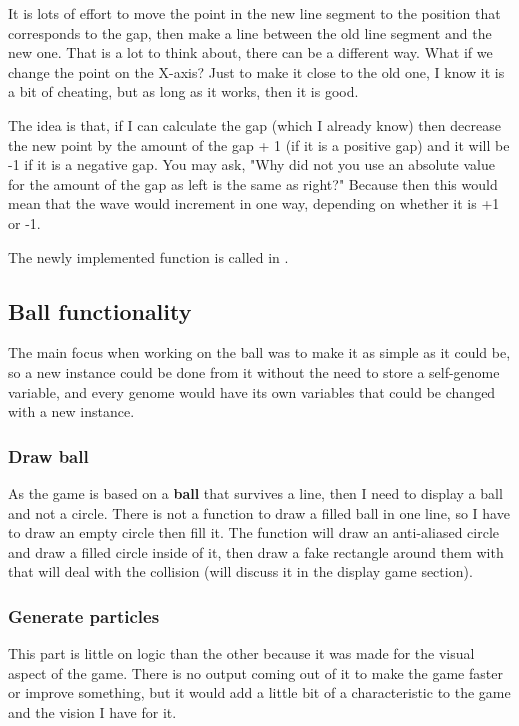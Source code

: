 It is lots of effort to move the point in the new line segment to the position that corresponds to the gap, then make a line between the old line segment and the new one. That is a lot to think about, there can be a different way. What if we change the point on the X-axis? Just to make it close to the old one, I know it is a bit of cheating, but as long as it works, then it is good.

The idea is that, if I can calculate the gap (which I already know) then decrease the new point by the amount of the gap + 1 (if it is a positive gap) and it will be -1 if it is a negative gap. You may ask, "Why did not you use an absolute value for the amount of the gap as left is the same as right?" Because then this would mean that the wave would increment in one way, depending on whether it is +1 or -1.

The newly implemented function is called  in .


\subsection{Ball functionality}\label{ball-functionality}
The main focus when working on the ball was to make it as simple as it could be, so a new instance could be done from it without the need to store a self-genome variable, and every genome would have its own variables that could be changed with a new instance.

\subsubsection{Draw ball}\label{draw-ball}
As the game is based on a \textbf{ball} that survives a line, then I need to display a ball and not a circle. There is not a function to draw a filled ball in one line, so I have to draw an empty circle then fill it. The function  will draw an anti-aliased circle and  draw a filled circle inside of it, then draw a fake rectangle around them with  that will deal with the collision (will discuss it in the display game section).

\subsubsection{Generate particles}\label{generate-particles}
This part is little on logic than the other because it was made for the visual aspect of the game. There is no output coming out of it to make the game faster or improve something, but it would add a little bit of a characteristic to the game and the vision I have for it.

